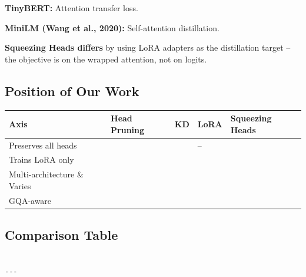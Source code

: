 \textbf{TinyBERT:} Attention transfer loss.

\textbf{MiniLM (Wang et al., 2020):} Self-attention distillation.

\textbf{Squeezing Heads differs} by using LoRA adapters as the distillation 
target -- the objective is on the wrapped attention, not on logits.

\subsection{Position of Our Work}

\begin{table}[H]
\centering
\small
\begin{tabular}{lllll}
\toprule
\textbf{Axis} & \textbf{Head Pruning} & \textbf{KD} & \textbf{LoRA} & \textbf{Squeezing Heads} \\
\midrule
Preserves all heads &  &  & -- &  \\
Trains LoRA only &  &  &  &  \\
Multi-architecture \& Varies &  &  &  \\
GQA-aware &  &  &  &  \\
\bottomrule
\end{tabular}
\end{table}

\subsection{Comparison Table}

\begin{lstlisting}

---
\end{lstlisting}